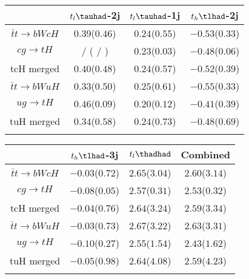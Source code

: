 \centering
\begin{tabular}{cccc} \toprule\toprule
 & $t_l\tauhad$-2j & $t_l\tauhad$-1j & $t_h\tlhad$-2j\\\midrule
$\bar{t}t\to bWcH$ & $0.39$($0.46$) & $0.24$($0.55$) & $-0.53$($0.33$) \\
$cg\to tH$         &  /    ( /    ) & $0.23$($0.03$) & $-0.48$($0.06$) \\
tcH merged         & $0.40$($0.48$) & $0.24$($0.57$) & $-0.52$($0.39$) \\
$\bar{t}t\to bWuH$ & $0.33$($0.50$) & $0.25$($0.61$) & $-0.55$($0.33$) \\
$ug\to tH$         & $0.46$($0.09$) & $0.20$($0.12$) & $-0.41$($0.39$) \\
tuH merged         & $0.34$($0.58$) & $0.24$($0.73$) & $-0.48$($0.69$) \\
\bottomrule\bottomrule\\
\end{tabular}
\begin{tabular}{cccc} \toprule\toprule
 & $t_h\tlhad$-3j & $t_l\thadhad$ & Combined\\\midrule
$\bar{t}t\to bWcH$  & $-0.03$($0.72$) &  $2.65$($3.04$) & $2.60$($3.14$)  \\
$cg\to tH$          & $-0.08$($0.05$) &  $2.57$($0.31$) & $2.53$($0.32$)  \\
tcH merged          & $-0.04$($0.76$) &  $2.64$($3.24$) & $2.59$($3.34$)  \\
$\bar{t}t\to bWuH$  & $-0.03$($0.73$) &  $2.67$($3.22$) & $2.63$($3.31$)  \\
$ug\to tH$          & $-0.10$($0.27$) &  $2.55$($1.54$) & $2.43$($1.62$)  \\
tuH merged          & $-0.05$($0.98$) &  $2.64$($4.08$) & $2.59$($4.23$)  \\
\bottomrule\bottomrule\\
\end{tabular}



